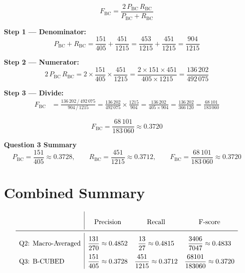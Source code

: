 \documentclass[11pt, a4paper]{article}
\begin{document}
\[
  F_{\mathrm{BC}}
  = \frac{2\,P_{\mathrm{BC}}\,R_{\mathrm{BC}}}{P_{\mathrm{BC}} + R_{\mathrm{BC}}}
\]

\textbf{Step 1 --- Denominator:}
\[
  P_{\mathrm{BC}} + R_{\mathrm{BC}}
  = \frac{151}{405} + \frac{451}{1215}
  = \frac{453}{1215} + \frac{451}{1215}
  = \frac{904}{1215}
\]

\textbf{Step 2 --- Numerator:}
\[
  2\,P_{\mathrm{BC}}\,R_{\mathrm{BC}}
  = 2 \times \frac{151}{405} \times \frac{451}{1215}
  = \frac{2 \times 151 \times 451}{405 \times 1215}
  = \frac{136\,202}{492\,075}
\]

\textbf{Step 3 --- Divide:}
\begin{align*}
  F_{\mathrm{BC}}
  &= \frac{136\,202\,/\,492\,075}{904\,/\,1215}
   = \frac{136\,202}{492\,075} \times \frac{1215}{904}
   = \frac{136\,202}{405 \times 904}
   = \frac{136\,202}{366\,120}
   = \frac{68\,101}{183\,060}
\end{align*}

\begin{mathbox}
\[
  F_{\mathrm{BC}} = \frac{68\,101}{183\,060} \approx 0.3720
\]
\end{mathbox}

\begin{insightbox}
\textbf{Question 3 Summary}
\[
  P_{\mathrm{BC}} = \frac{151}{405} \approx 0.3728, \qquad
  R_{\mathrm{BC}} = \frac{451}{1215} \approx 0.3712, \qquad
  F_{\mathrm{BC}} = \frac{68\,101}{183\,060} \approx 0.3720
\]
\end{insightbox}

\section{Combined Summary}

\begin{insightbox}
\[
\renewcommand{\arraystretch}{2.2}
\begin{array}{l|ccc}
 & \text{Precision} & \text{Recall} & \text{F-score} \\
\midrule
\text{Q2: Macro-Averaged}
  & \dfrac{131}{270} \approx 0.4852
  & \dfrac{13}{27}   \approx 0.4815
  & \dfrac{3406}{7047} \approx 0.4833 \\
\text{Q3: B-CUBED}
  & \dfrac{151}{405} \approx 0.3728
  & \dfrac{451}{1215} \approx 0.3712
  & \dfrac{68101}{183060} \approx 0.3720 \\
\end{array}
\]
\end{insightbox}
\end{document}
